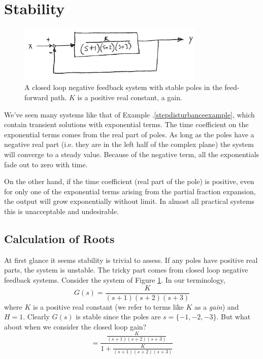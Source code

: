 \section{Stability}\label{FeedbackStabilitySection}


\begin{figure}\centering
\includegraphics[width=3.5in]{figs06/00779a.png}
\caption{A closed loop negative feedback system with stable poles in the feed-forward path. $K$ is a positive real constant, a gain.}\label{openloopstable}
\end{figure}

We've seen many systems like that of Example \thechapter.\ref{stepdisturbanceexample}, which contain transient solutions with exponential terms.
The time coefficient on the exponential terms comes from the real part of poles.
As long as the poles have a negative real part (i.e. they are in the left half of the complex plane)
the system will converge to a steady value.
Because of the negative term, all the exponentials fade out to zero with time.

On the other hand, if the time coefficient (real part of the pole) is positive, even for only one of the exponential terms arising from the partial fraction expansion, the output will grow exponentially without limit.  In almost all practical systems this is unacceptable and undesirable.

\subsection{Calculation of Roots}\label{calculationofroots}

At first glance it seems stability is trivial to assess.  If any poles have positive real parts, the system is unstable.  The tricky part comes from closed loop negative feedback systems.   Consider the system of Figure \ref{openloopstable}.  In our terminology,
\[
G(s) =  \frac  {K}  {(s+1)(s+2)(s+3)}
\]
where $K$ is a positive real constant (we refer to terms like $K$ as a {\it gain}) and $H=1$.
Clearly $G(s)$ is stable since the poles are $s=\{-1, -2, -3\}$.
But what about when we consider the closed loop gain?
\[ =  \frac{\frac{K}{(s+1)(s+2)(s+3)}}  {1+ \frac  {K}  {(s+1)(s+2)(s+3)}}
\]

